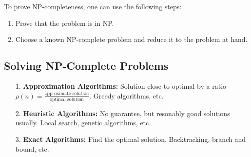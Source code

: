 \documentclass{article}
\begin{document}
To prove NP-completeness, one can use the following steps:
\begin{enumerate}
  \item Prove that the problem is in NP.
  \item Choose a known NP-complete problem and reduce it to the problem at hand.
\end{enumerate}

\subsection{Solving NP-Complete Problems}
\begin{enumerate}
  \item[1.] \textbf{Approximation Algorithms:} Solution close to optimal by a ratio $\rho(n) = \frac{\text{approximate solution}}{\text{optimal solution}}$. Greedy algorithms, etc.
  \item[2.] \textbf{Heuristic Algorithms:} No guarantee, but resonably good solutions usually. Local search, genetic algorithms, etc.
  \item[3.] \textbf{Exact Algorithms:} Find the optimal solution. Backtracking, branch and bound, etc.
\end{enumerate}
\end{document}
